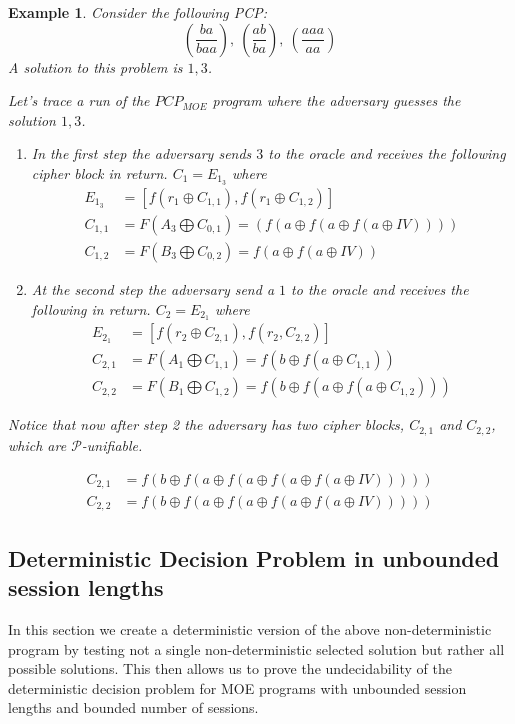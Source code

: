 \documentclass{easychair}
\newtheorem{example}{Example}
\begin{document}
\begin{example}
	Consider the following PCP:
	\[
	(\frac{ba}{baa}),~(\frac{ab}{ba}),~(\frac{aaa}{aa})
	\] 
	A solution to this problem is $1,3$. 
	
	Let's trace a run of the $PCP_{MOE}$ program where the 
	adversary guesses the solution $1,3$.
	\begin{enumerate}
		\item In the first step the adversary sends $3$ to the
		oracle and receives the following cipher block in return.
		$C_1 = E_{1_3}$ where
		\begin{align*}
		E_{1_3} &= [f(r_1 \oplus C_{1, 1}), f(r_1 \oplus C_{1,2}) ] \\
		C_{1,1} &= F(A_3 \bigoplus C_{0, 1}) = 
		(f(a \oplus f(a \oplus f(a \oplus IV))))	\\
		C_{1,2} &= F(B_3 \bigoplus C_{0, 2}) =
		f(a \oplus f(a \oplus IV))
		\end{align*}
		\item At the second step the adversary send a $1$ to the
		oracle and receives the following in return.
		$C_2 = E_{2_1}$ where
		\begin{align*}
		E_{2_1} &= [f(r_2 \oplus C_{2, 1}), f(r_2, C_{2,2}) ] \\
		C_{2,1} &= F(A_1 \bigoplus C_{1, 1}) = 
		f(b \oplus f(a \oplus C_{1,1}))	\\
		C_{2,2} &= F(B_1 \bigoplus C_{1, 2}) =
		f(b \oplus f(a \oplus f(a \oplus C_{1,2})))
		\end{align*}
	\end{enumerate}
	Notice that now after step 2 the adversary has two 
	cipher blocks, $C_{2,1}$ and $C_{2,2}$, which are
	$\mathcal{P}$-unifiable.
	
\begin{align*}
C_{2,1} &= f(b \oplus f(a \oplus f(a \oplus f(a \oplus f(a \oplus IV))))) \\
C_{2,2} &= f(b \oplus f(a \oplus f(a \oplus f(a \oplus f(a \oplus IV)))))
\end{align*}

\end{example}


\subsection{Deterministic Decision Problem in unbounded session lengths}\label{sec:UB-det-func}
In this section we create a deterministic version of the 
above non-deterministic program by testing not a single 
non-deterministic selected solution but rather all possible
solutions. This then allows us to prove the undecidability
of the deterministic decision problem for MOE programs 
with unbounded session lengths and bounded number of sessions. 
\end{document}
